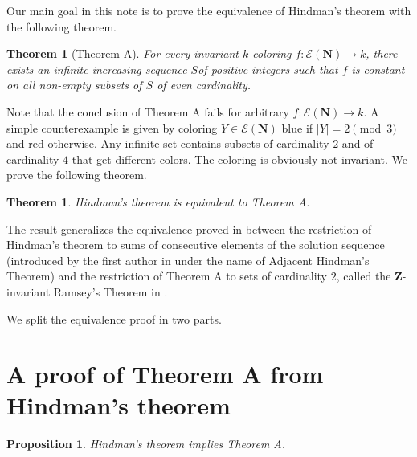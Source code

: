 \documentclass[11pt]{amsart}
\newcommand{\Nat}{\mathbf{N}}
\newtheorem*{theorem*}{Theorem}
\newtheorem{theorem}{Theorem}[section]
\newtheorem{proposition}{Proposition}[section]
\theoremstyle{definition}
\begin{document}
Our main goal in this note is to prove the equivalence of Hindman's theorem with the following theorem.

\begin{theorem*}[Theorem A]
For every invariant $k$-coloring $f:\mathcal{E}(\Nat)\rightarrow k$, there exists an infinite increasing sequence $S$of positive integers such that $f$ is constant on all non-empty subsets of $S$ of even cardinality.
\end{theorem*}

Note that the conclusion of Theorem A fails for arbitrary $f:\mathcal{E}(\Nat)\rightarrow k$. A simple counterexample is given by coloring $Y \in \mathcal{E}(\Nat)$ blue if $|Y| = 2 \pmod 3$ and red otherwise. Any infinite set contains subsets of cardinality $2$ and of cardinality $4$ that get different colors. The coloring is obviously not invariant. We prove the following theorem.

\begin{theorem}\label{thm:main}
Hindman's theorem is equivalent to Theorem A.
\end{theorem}

The result generalizes the equivalence proved in \cite{Bre:26} between the restriction of Hindman's theorem to sums of consecutive elements of the solution sequence (introduced by the first author in \cite{Car:18:weak} under the name of Adjacent Hindman's Theorem) and the restriction of Theorem A to sets of cardinality $2$, called the $\mathbf{Z}$-invariant Ramsey's Theorem in \cite{Bre:26}.

We split the equivalence proof in two parts. 

\section{A proof of Theorem A from Hindman's theorem}

\begin{proposition}
Hindman's theorem implies Theorem A.
\end{proposition}
\end{document}
